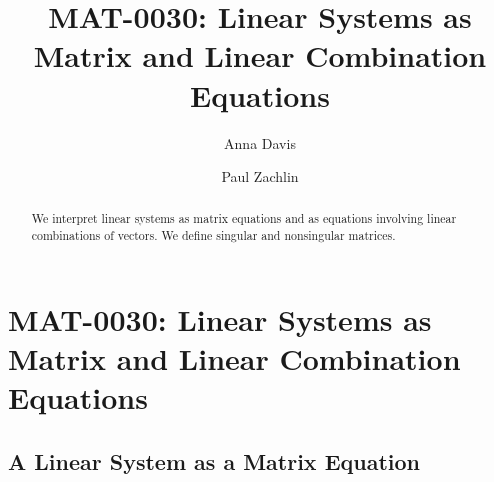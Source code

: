 \documentclass{ximera}
\author{Anna Davis \and Paul Zachlin} \title{MAT-0030: Linear Systems as Matrix and Linear Combination Equations} \license{CC-BY 4.0}
\begin{document}
\begin{abstract}
  We interpret linear systems as matrix equations and as equations involving linear combinations of vectors.  We define singular and nonsingular matrices.
\end{abstract}
\maketitle

\section*{MAT-0030: Linear Systems as Matrix and Linear Combination Equations}

\subsection*{A Linear System as a Matrix Equation}
\end{document}

